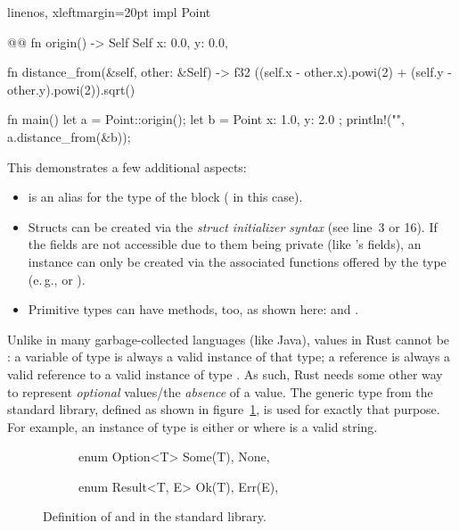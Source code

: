 \begin{rustcode*}{linenos, xleftmargin=20pt}
impl Point { @@
    fn origin() -> Self {
        Self {
            x: 0.0,
            y: 0.0,
        }
    }

    fn distance_from(&self, other: &Self) -> f32 {
        ((self.x - other.x).powi(2) + (self.y - other.y).powi(2)).sqrt()
    }
}

fn main() {
    let a = Point::origin();
    let b = Point { x: 1.0, y: 2.0 };
    println!("{}", a.distance_from(&b));
}
\end{rustcode*}

This demonstrates a few additional aspects:

\vspace{-3mm}
\begin{itemize}
  \item {} is an alias for the type of the  block ( in this case).
  \item Structs can be created via the \emph{struct initializer syntax} (see line~3 or 16).
  If the fields are not accessible due to them being private (like 's fields), an instance can only be created via the associated functions offered by the type (e.\,g.,  or ).
  \item Primitive types can have methods, too, as shown here:  and .
\end{itemize}

Unlike in many garbage-collected languages (like Java), values in Rust cannot be :
a variable of type  is always a valid instance of that type; a reference  is always a valid reference to a valid instance of type .
As such, Rust needs some other way to represent \emph{optional} values/the \emph{absence} of a value.
The generic type  from the standard library, defined as shown in figure~\ref{fig:option-result-def}, is used for exactly that purpose.
For example, an instance of type  is either  or  where  is a valid string.

\begin{figure}[b]
\centering
\begin{subfigure}{.4\textwidth}
\begin{rustcode}
enum Option<T> {
    Some(T),
    None,
}
\end{rustcode}
\end{subfigure}
\begin{subfigure}{.4\textwidth}
\begin{rustcode}
enum Result<T, E> {
    Ok(T),
    Err(E),
}
\end{rustcode}
\end{subfigure}
\caption{Definition of  and  in the standard library.}
\label{fig:option-result-def}
\end{figure}

